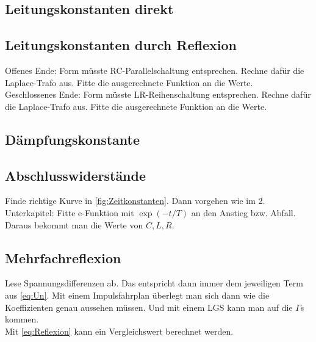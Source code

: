 \subsection{Leitungskonstanten direkt}
\clearpage
\subsection{Leitungskonstanten durch Reflexion}
Offenes Ende: Form müsste RC-Parallelschaltung entsprechen. Rechne dafür die Laplace-Trafo aus. Fitte die ausgerechnete Funktion an die Werte. \\
Geschlossenes Ende: Form müsste LR-Reihenschaltung entsprechen. Rechne dafür die Laplace-Trafo aus. Fitte die ausgerechnete Funktion an die Werte.
\subsection{Dämpfungskonstante}

\subsection{Abschlusswiderstände}
Finde richtige Kurve in \ref{fig:Zeitkonstanten}. Dann vorgehen wie im 2. Unterkapitel: Fitte e-Funktion mit $\exp(-t/T)$ an den Anstieg bzw. Abfall. Daraus bekommt man die Werte von $C,L,R$.
\subsection{Mehrfachreflexion}

Lese Spannungsdifferenzen ab. Das entspricht dann immer dem jeweiligen Term aus \eqref{eq:Un}. Mit einem Impulsfahrplan überlegt man sich dann wie die Koeffizienten genau aussehen müssen. Und mit einem LGS kann man auf die $\Gamma$s kommen. \\
Mit \eqref{eq:Reflexion} kann ein Vergleichswert berechnet werden.